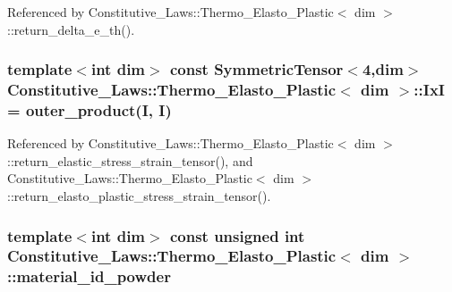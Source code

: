 Referenced by Constitutive\+\_\+\+Laws\+::\+Thermo\+\_\+\+Elasto\+\_\+\+Plastic$<$ dim $>$\+::return\+\_\+delta\+\_\+e\+\_\+th().

\subsubsection[{\texorpdfstring{IxI}{IxI}}]{\setlength{\rightskip}{0pt plus 5cm}template$<$int dim$>$ const Symmetric\+Tensor$<$4,dim$>$ {\bf Constitutive\+\_\+\+Laws\+::\+Thermo\+\_\+\+Elasto\+\_\+\+Plastic}$<$ dim $>$\+::IxI = outer\+\_\+product({\bf I}, {\bf I})\hspace{0.3cm}{\ttfamily [private]}}\hypertarget{classConstitutive__Laws_1_1Thermo__Elasto__Plastic_a3e093ae5b5ef432f1f4fea14148dd8e1}{}\label{classConstitutive__Laws_1_1Thermo__Elasto__Plastic_a3e093ae5b5ef432f1f4fea14148dd8e1}


Referenced by Constitutive\+\_\+\+Laws\+::\+Thermo\+\_\+\+Elasto\+\_\+\+Plastic$<$ dim $>$\+::return\+\_\+elastic\+\_\+stress\+\_\+strain\+\_\+tensor(), and Constitutive\+\_\+\+Laws\+::\+Thermo\+\_\+\+Elasto\+\_\+\+Plastic$<$ dim $>$\+::return\+\_\+elasto\+\_\+plastic\+\_\+stress\+\_\+strain\+\_\+tensor().

\subsubsection[{\texorpdfstring{material\+\_\+id\+\_\+powder}{material_id_powder}}]{\setlength{\rightskip}{0pt plus 5cm}template$<$int dim$>$ const unsigned int {\bf Constitutive\+\_\+\+Laws\+::\+Thermo\+\_\+\+Elasto\+\_\+\+Plastic}$<$ dim $>$\+::material\+\_\+id\+\_\+powder\hspace{0.3cm}{\ttfamily [private]}}\hypertarget{classConstitutive__Laws_1_1Thermo__Elasto__Plastic_a4f2bdb1404b0706803da3407ce991667}{}\label{classConstitutive__Laws_1_1Thermo__Elasto__Plastic_a4f2bdb1404b0706803da3407ce991667}


